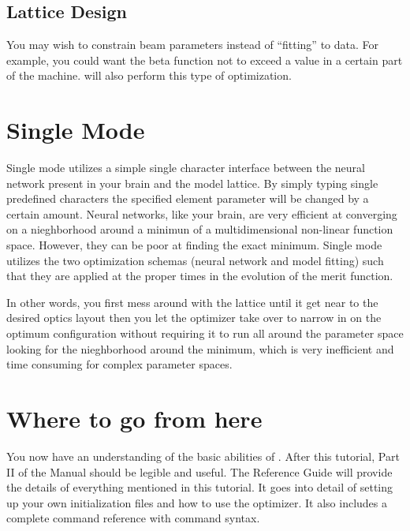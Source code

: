 \subsection{Lattice Design}
\label{ss:lattice_design}

You may wish to constrain beam parameters instead of ``fitting'' to data. For
example, you could want the beta function not to exceed a value in a certain
part of the machine. \tao will also perform this type of optimization.


\section{Single Mode}
\label{s:single_mode}

Single mode utilizes a simple single character interface between the neural 
network present in your brain and the \tao model lattice. By simply typing
single predefined characters the specified element parameter will be changed by
a certain amount. Neural networks, like your brain, are very efficient at
converging on a nieghborhood around a minimun of a multidimensional non-linear
function space. However, they can be poor at finding the exact minimum. Single mode
utilizes the two optimization schemas (neural network and model fitting) such
that they are applied at the proper times in the evolution of the merit
function.

In other words, you first mess around with the lattice until it get near to the
desired optics layout then you let the optimizer take over to narrow in on the
optimum configuration without requiring it to run all around the
parameter space looking for the nieghborhood around the minimum, which is very
inefficient and time consuming for complex parameter spaces.


\section{Where to go from here}
\label{s:where_to_go}

You now have an understanding of the basic abilities of \tao. After this
tutorial, Part II of the \tao Manual should be legible and useful.
The Reference Guide will provide the details of everything mentioned in this tutorial. 
It goes into detail of setting up your own initialization
files and how to use the optimizer. It also includes a complete command
reference with command syntax.

